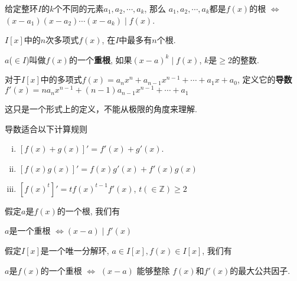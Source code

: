 \begin{Theorem}
给定整环$I$的$k$个不同的元素$a_1, a_2, \cdots, a_k$, 那么
$a_1, a_2, \cdots, a_k$都是$f(x)$的根 $\Leftrightarrow$ 
$(x - a_1)(x - a_2)\cdots(x-a_k) \mid f(x)$.
\end{Theorem}

\begin{Corollary}
$I[x]$中的$n$次多项式$f(x)$, 在$I$中最多有$n$个根.
\end{Corollary}

\begin{Definition}[重根]
$a$\;($\in I$)叫做$f(x)$的一个\textbf{重根}, 如果$(x - a)^k \mid f(x)$, $k$是$\ge 2$的整数.
\end{Definition}

\begin{Definition}[导数]
对于$I[x]$中的多项式$f(x) = a_n x^n +a_{n-1} x^{n-1} + \cdots +a_1 x +a_0$,
定义它的\textbf{导数}$f'(x) = n a_n x^{n-1} + (n-1) a_{n-1} x^{n-1} + \cdots + a_1$
\end{Definition}

\begin{Note}
这只是一个形式上的定义，不能从极限的角度来理解.
\end{Note}

\begin{Proposition}
导数适合以下计算规则
\begin{enumerate}[(i)]
	\item $[f(x) +g(x)]' = f'(x) + g'(x)$.
	\item $[f(x)g(x)]' = f(x) g'(x) +f'(x) g(x)$
	\item $[f(x)^t]' = t f(x)^{t-1}f'(x)$, $t (\in \mathbb{Z})\ge 2$
\end{enumerate}
\end{Proposition}

\begin{Theorem}
假定$a$是$f(x)$的一个根, 我们有 %
 \begin{tightcenter}{ $a$是一个重根 $\Leftrightarrow (x - a) \mid f'(x)$}
 \end{tightcenter}
\end{Theorem}

\begin{Corollary}
假定$I[x]$是一个唯一分解环, $a \in I[x], f(x) \in I[x]$, 我们有
\begin{tightcenter}
$a$是$f(x)$的一个重根 $\Leftrightarrow$ $(x - a)  $ 能够整除 $f(x)$和$f'(x)$的最大公共因子.
\end{tightcenter}
\end{Corollary}

